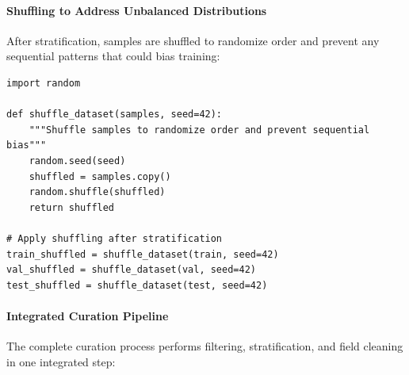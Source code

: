 \paragraph{Shuffling to Address Unbalanced Distributions}

After stratification, samples are shuffled to randomize order and prevent any sequential patterns that could bias training:

\begin{lstlisting}[style=pythonstyle, caption=Shuffling to address unbalanced distributions]
import random

def shuffle_dataset(samples, seed=42):
    """Shuffle samples to randomize order and prevent sequential bias"""
    random.seed(seed)
    shuffled = samples.copy()
    random.shuffle(shuffled)
    return shuffled

# Apply shuffling after stratification
train_shuffled = shuffle_dataset(train, seed=42)
val_shuffled = shuffle_dataset(val, seed=42)
test_shuffled = shuffle_dataset(test, seed=42)
\end{lstlisting}

\paragraph{Integrated Curation Pipeline}

The complete curation process performs filtering, stratification, and field cleaning in one integrated step:

